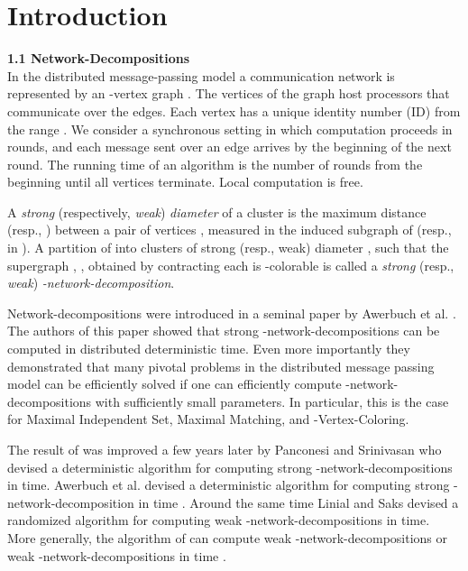 \documentclass[11pt]{article}
\begin{document}
\section{Introduction}
{\bf 1.1 Network-Decompositions\\}
In the distributed message-passing model a communication network is represented by an -vertex graph . The vertices of the graph host processors that communicate over the edges. Each vertex has a unique identity number (ID) from the range . We consider a synchronous setting in which computation proceeds in rounds, and each message sent over an edge arrives by the beginning of the next round. The running time of an algorithm is the number of rounds from the beginning until all vertices terminate. Local computation is free.














A {\em strong} (respectively, {\em weak}) {\em diameter} of a cluster  is the maximum distance  (resp., ) between a pair of vertices , measured in the induced subgraph  of  (resp., in ). A partition  of  into clusters of strong (resp., weak) diameter , such that the supergraph , ,  obtained by contracting each  is -colorable is called a {\em strong} (resp., {\em weak}) {\em -network-decomposition}.

Network-decompositions were introduced in a seminal paper by Awerbuch et al. \cite{AGLP89}. The authors of this paper showed that strong  -network-decompositions can be computed in distributed deterministic  time. Even more importantly they demonstrated that many pivotal problems in the distributed message passing model can be efficiently solved if one can efficiently compute -network-decompositions with sufficiently small parameters. In particular, this is the case for Maximal Independent Set, Maximal Matching, and -Vertex-Coloring.

The result of \cite{AGLP89} was improved a few years later by Panconesi and Srinivasan \cite{PS95} who devised a deterministic algorithm for computing strong  -network-decompositions in  time. Awerbuch et al. \cite{ABCP96} devised a deterministic algorithm for computing strong -network-decomposition in time .  Around the same time Linial and Saks \cite{LS92} devised a randomized algorithm for computing weak -network-decompositions in  time. More generally, the algorithm of \cite{LS92} can compute weak -network-decompositions or weak -network-decompositions in time .
\end{document}
